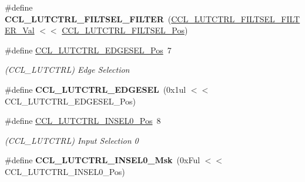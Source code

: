 \begin{DoxyCompactItemize}
\item 
\hypertarget{group___s_a_m_l21___c_c_l_ga67582515ae6a2cb60e9456aa6e9eb93c}{}\#define {\bfseries C\+C\+L\+\_\+\+L\+U\+T\+C\+T\+R\+L\+\_\+\+F\+I\+L\+T\+S\+E\+L\+\_\+\+F\+I\+L\+T\+E\+R}~(\hyperlink{group___s_a_m_l21___c_c_l_ga746ff0c425c61df00bf0ff42c89e2300}{C\+C\+L\+\_\+\+L\+U\+T\+C\+T\+R\+L\+\_\+\+F\+I\+L\+T\+S\+E\+L\+\_\+\+F\+I\+L\+T\+E\+R\+\_\+\+Val} $<$$<$ \hyperlink{group___s_a_m_l21___c_c_l_ga671613b8892335b9651f695fb293057a}{C\+C\+L\+\_\+\+L\+U\+T\+C\+T\+R\+L\+\_\+\+F\+I\+L\+T\+S\+E\+L\+\_\+\+Pos})\label{group___s_a_m_l21___c_c_l_ga67582515ae6a2cb60e9456aa6e9eb93c}

\item 
\hypertarget{group___s_a_m_l21___c_c_l_gab20c6c3c219abf3c1f952d47e94c7cae}{}\#define \hyperlink{group___s_a_m_l21___c_c_l_gab20c6c3c219abf3c1f952d47e94c7cae}{C\+C\+L\+\_\+\+L\+U\+T\+C\+T\+R\+L\+\_\+\+E\+D\+G\+E\+S\+E\+L\+\_\+\+Pos}~7\label{group___s_a_m_l21___c_c_l_gab20c6c3c219abf3c1f952d47e94c7cae}

\begin{DoxyCompactList}\small\item\em (C\+C\+L\+\_\+\+L\+U\+T\+C\+T\+R\+L) Edge Selection \end{DoxyCompactList}\item 
\hypertarget{group___s_a_m_l21___c_c_l_ga87a141871ae76dae36a2f1cc63c286b0}{}\#define {\bfseries C\+C\+L\+\_\+\+L\+U\+T\+C\+T\+R\+L\+\_\+\+E\+D\+G\+E\+S\+E\+L}~(0x1ul $<$$<$ C\+C\+L\+\_\+\+L\+U\+T\+C\+T\+R\+L\+\_\+\+E\+D\+G\+E\+S\+E\+L\+\_\+\+Pos)\label{group___s_a_m_l21___c_c_l_ga87a141871ae76dae36a2f1cc63c286b0}

\item 
\hypertarget{group___s_a_m_l21___c_c_l_gae20b08aa5e8fcd9eb3a1a118441de53d}{}\#define \hyperlink{group___s_a_m_l21___c_c_l_gae20b08aa5e8fcd9eb3a1a118441de53d}{C\+C\+L\+\_\+\+L\+U\+T\+C\+T\+R\+L\+\_\+\+I\+N\+S\+E\+L0\+\_\+\+Pos}~8\label{group___s_a_m_l21___c_c_l_gae20b08aa5e8fcd9eb3a1a118441de53d}

\begin{DoxyCompactList}\small\item\em (C\+C\+L\+\_\+\+L\+U\+T\+C\+T\+R\+L) Input Selection 0 \end{DoxyCompactList}\item 
\hypertarget{group___s_a_m_l21___c_c_l_gaf8543ae9dd72413e04d3b6403e5ce238}{}\#define {\bfseries C\+C\+L\+\_\+\+L\+U\+T\+C\+T\+R\+L\+\_\+\+I\+N\+S\+E\+L0\+\_\+\+Msk}~(0x\+Ful $<$$<$ C\+C\+L\+\_\+\+L\+U\+T\+C\+T\+R\+L\+\_\+\+I\+N\+S\+E\+L0\+\_\+\+Pos)\label{group___s_a_m_l21___c_c_l_gaf8543ae9dd72413e04d3b6403e5ce238}


\end{DoxyCompactItemize}
